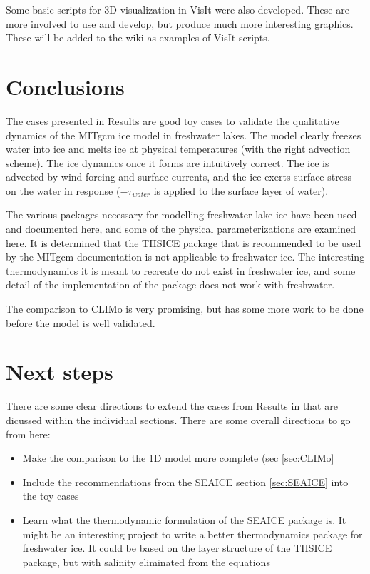 \documentclass[11pt]{article}
\begin{document}
Some basic scripts for 3D visualization in VisIt were also developed. These are more involved to use and develop, but produce much more interesting graphics. These will be added to the wiki as examples of VisIt scripts.

\section{Conclusions}
The cases presented in Results are good toy cases to validate the qualitative dynamics of the MITgcm ice model in freshwater lakes. The model clearly freezes water into ice and melts ice at physical temperatures (with the right advection scheme). The ice dynamics once it forms are intuitively correct. The ice is advected by wind forcing and surface currents, and the ice exerts surface stress on the water in response ($-\tau_{water}$ is applied to the surface layer of water).

The various packages necessary for modelling freshwater lake ice have been used and documented here, and some of the physical parameterizations are examined here. It is determined that the THSICE package that is recommended to be used by the MITgcm documentation is not applicable to freshwater ice. The interesting thermodynamics it is meant to recreate do not exist in freshwater ice, and some detail of the implementation of the package does not work with freshwater.

The comparison to CLIMo is very promising, but has some more work to be done before the model is well validated.

\section{Next steps}
There are some clear directions to extend the cases from Results in that are dicussed within the individual sections. There are some overall directions to go from here:
\begin{itemize}
\item{Make the comparison to the 1D model more complete (sec \ref{sec:CLIMo}}
\item{Include the recommendations from the SEAICE section \ref{sec:SEAICE} into the toy cases}
\item{Learn what the thermodynamic formulation of the SEAICE package is. It might be an interesting project to write a better thermodynamics package for freshwater ice. It could be based on the layer structure of the THSICE package, but with salinity eliminated from the equations}
\end{itemize}
\end{document}
